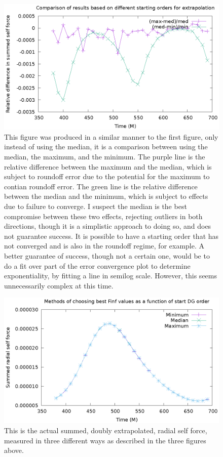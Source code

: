 \begin{figure}
  \includegraphics{minmaxmedrelativeerror3termavgl.eps}
  \caption{This figure was produced in a similar manner to the first figure, only instead of using the median, it is a comparison between using the median, the maximum, and the minimum. The purple line is the relative difference between the maximum and the median, which is subject to roundoff error due to the potential for the maximum to contian roundoff error. The green line is the relative difference between the median and the minimum, which is subject to effects due to failure to converge. I suspect the median is the best compromise between these two effects, rejecting outliers in both directions, though it is a simplistic approach to doing so, and does not guarantee success. It is possible to have a starting order that has not converged and is also in the roundoff regime, for example. A better guarantee of success, though not a certain one, would be to do a fit over part of the error convergence plot to determine exponentiality, by fitting a line in semilog scale. However, this seems unnecessarily complex at this time.}
\end{figure}
  
\begin{figure}
  \includegraphics{bestfinfscriptplot.eps}
  \caption{This is the actual summed, doubly extrapolated, radial self force, measured in three different ways as described in the three figures above.}
\end{figure}




